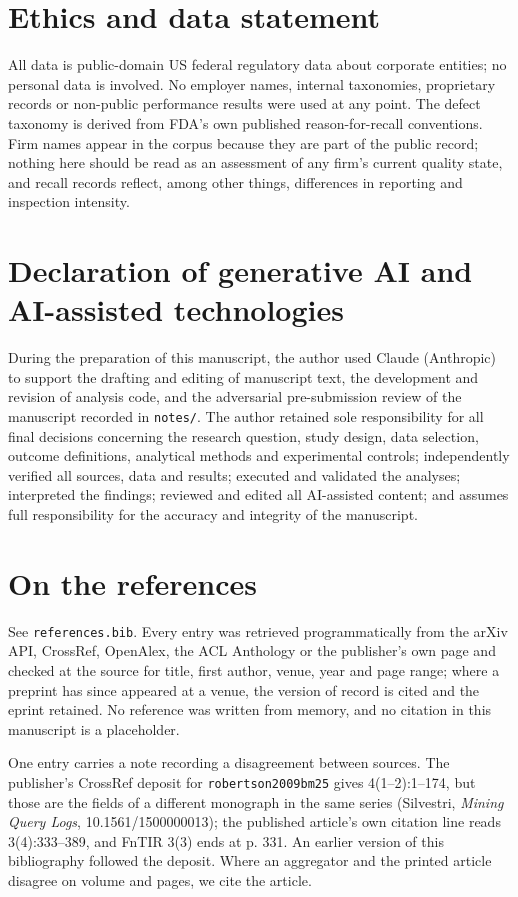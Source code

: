 \documentclass[runningheads]{llncs}
\begin{document}
\section*{Ethics and data statement}
All data is public-domain US federal regulatory data about corporate entities; no personal data is involved. No employer names, internal taxonomies, proprietary records or non-public performance results were used at any point. The defect taxonomy is derived from FDA's own published reason-for-recall conventions. Firm names appear in the corpus because they are part of the public record; nothing here should be read as an assessment of any firm's current quality state, and recall records reflect, among other things, differences in reporting and inspection intensity.


\section*{Declaration of generative AI and AI-assisted technologies}
During the preparation of this manuscript, the author used Claude (Anthropic) to support the drafting and editing of manuscript text, the development and revision of analysis code, and the adversarial pre-submission review of the manuscript recorded in \texttt{notes/}. The author retained sole responsibility for all final decisions concerning the research question, study design, data selection, outcome definitions, analytical methods and experimental controls; independently verified all sources, data and results; executed and validated the analyses; interpreted the findings; reviewed and edited all AI-assisted content; and assumes full responsibility for the accuracy and integrity of the manuscript.


\section*{On the references}
See \texttt{references.bib}. Every entry was retrieved programmatically from the arXiv API, CrossRef, OpenAlex, the ACL Anthology or the publisher's own page and checked at the source for title, first author, venue, year and page range; where a preprint has since appeared at a venue, the version of record is cited and the eprint retained. No reference was written from memory, and no citation in this manuscript is a placeholder.

One entry carries a note recording a disagreement between sources. The publisher's CrossRef deposit for \texttt{robertson2009bm25} gives 4(1--2):1--174, but those are the fields of a different monograph in the same series (Silvestri, \textit{Mining Query Logs}, 10.1561/1500000013); the published article's own citation line reads 3(4):333--389, and FnTIR 3(3) ends at p. 331. An earlier version of this bibliography followed the deposit. Where an aggregator and the printed article disagree on volume and pages, we cite the article.




\end{document}

